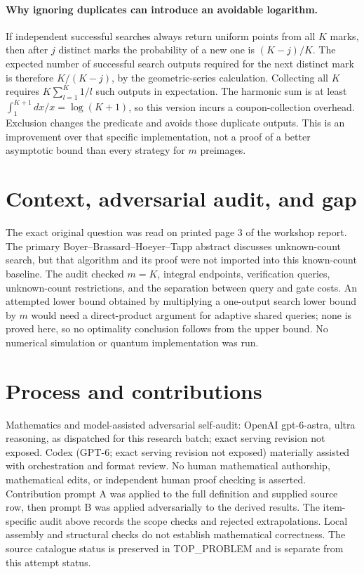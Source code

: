 \documentclass[11pt]{article}
\begin{document}
\paragraph{Why ignoring duplicates can introduce an avoidable logarithm.}
If independent successful searches always return uniform points from all $K$
marks, then after $j$ distinct marks the probability of a new one is
$(K-j)/K$. The expected number of successful search outputs required for the
next distinct mark is therefore $K/(K-j)$, by the geometric-series calculation.
Collecting all $K$ requires $K\sum_{l=1}^K1/l$ such outputs in expectation.
The harmonic sum is at least $\int_1^{K+1}dx/x=\log(K+1)$, so this
version incurs a coupon-collection overhead. Exclusion changes the predicate
and avoids those duplicate outputs. This is an improvement over that specific
implementation, not a proof of a better asymptotic bound than every strategy
for $m$ preimages.

\section{Context, adversarial audit, and gap}
The exact original question was read on printed page 3 of the workshop report.
The primary Boyer--Brassard--Hoeyer--Tapp abstract discusses unknown-count
search, but that algorithm and its proof were not imported into this known-count
baseline. The audit checked $m=K$, integral endpoints, verification queries,
unknown-count restrictions, and the separation between query and gate costs.
An attempted lower bound obtained by multiplying a one-output search lower
bound by $m$ would need a direct-product argument for adaptive shared queries;
none is proved here, so no optimality conclusion follows from the upper bound.
No numerical simulation or quantum implementation was run.

\section{Process and contributions}
Mathematics and model-assisted adversarial self-audit: OpenAI gpt-6-astra, ultra reasoning, as dispatched for this research batch; exact serving revision not exposed. Codex (GPT-6; exact serving revision not exposed) materially assisted with orchestration and format review. No human mathematical authorship, mathematical edits, or independent human proof checking is asserted.
Contribution prompt A was applied to the full definition and supplied source row, then prompt B was applied adversarially to the derived results. The item-specific audit above records the scope checks and rejected extrapolations. Local assembly and structural checks do not establish mathematical correctness. The source catalogue status is preserved in TOP\_PROBLEM and is separate from this attempt status.
\end{document}
